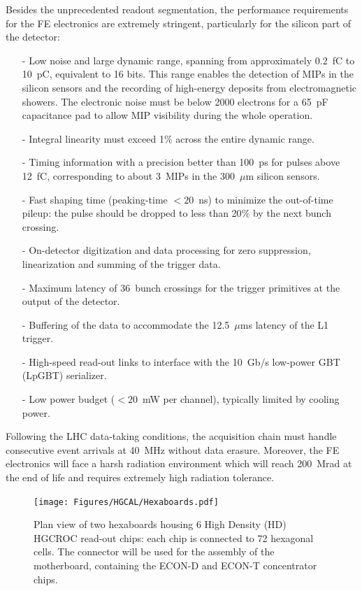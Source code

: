Besides the unprecedented readout segmentation, the performance requirements for the FE electronics are extremely stringent, particularly for the silicon part of the detector:
\begin{itemize}
    \item [-] Low noise and large dynamic range, spanning from approximately 0.2~fC to 10~pC, equivalent to 16 bits. This range enables the detection of MIPs in the silicon sensors and the recording of high-energy deposits from electromagnetic showers. 
    The electronic noise must be below 2000 electrons for a 65~pF capacitance pad to allow MIP visibility during the whole operation.
    \item [-] Integral linearity must exceed 1$\%$ across the entire dynamic range.
    \item [-] Timing information with a precision better than 100~ps for pulses above 12~fC, corresponding to about 3~MIPs in the 300~$\mu$m silicon sensors.
    \item [-] Fast shaping time (peaking-time $<20$~ns) to minimize the out-of-time pileup: the pulse should be dropped to less than 20$\%$ by the next bunch crossing.
    \item [-] On-detector digitization and data processing for zero suppression, linearization and summing of the trigger data.
    \item [-] Maximum latency of 36~bunch crossings for the trigger primitives at the output of the detector.
    \item [-] Buffering of the data to accommodate the 12.5~$\mu$ms latency of the L1 trigger.
    \item [-] High-speed read-out links to interface with the 10~Gb/s low-power GBT (LpGBT) serializer.
    \item [-] Low power budget ($<20$~mW per channel), typically limited by cooling power.
\end{itemize}

Following the LHC data-taking conditions, the acquisition chain must handle consecutive event arrivals at 40~MHz without data erasure.
Moreover, the FE electronics will face a harsh radiation environment which will reach 200~Mrad at the end of life and requires extremely high radiation tolerance.

\begin{figure}
    \centering
    \texttt{[image: Figures/HGCAL/Hexaboards.pdf]}
    \caption{Plan view of two hexaboards housing 6 High Density (HD) HGCROC read-out chips: each chip is connected to 72 hexagonal cells. The connector will be used for the assembly of the motherboard, containing the ECON-D and ECON-T concentrator chips.}
    \label{fig:Hexaboards}
\end{figure}

